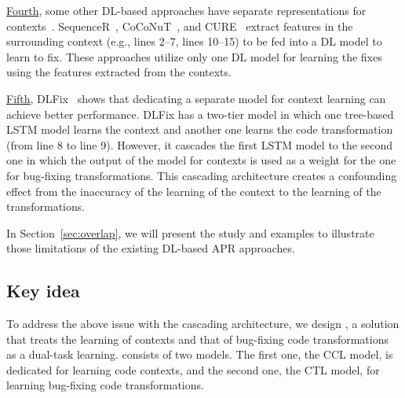 \underline{Fourth}, some other DL-based approaches have separate
representations for
contexts~\cite{chen2018sequencer,cure-icse21,lutellier2020coconut}.
SequenceR~\cite{chen2018sequencer},
CoCoNuT~\cite{lutellier2020coconut}, and CURE~\cite{cure-icse21}
extract features in the surrounding context (e.g., lines 2--7, lines
10--15) to be fed into a DL model to learn to fix. These approaches
utilize only one DL model for learning the fixes using the features
extracted from the contexts.


\underline{Fifth}, DLFix~\cite{icse20} shows that dedicating a
separate model for context learning can achieve better performance.
DLFix has a two-tier model in which one tree-based LSTM model learns
the context and another one learns the code transformation (from line
8 to line 9). However, it cascades the first LSTM model to the second
one in which the output of the model for contexts is used as a weight
for the one for bug-fixing transformations. This cascading
architecture creates a confounding effect from the inaccuracy of the
learning of the context to the learning of the transformations.

In Section~\ref{sec:overlap}, we will present the study and examples
to illustrate those limitations of the existing DL-based APR approaches.

\subsection{Key idea}
\label{sec:key-idea}

To address the above issue with the cascading architecture, we design
{\tool}, a solution that treats the learning of contexts and that of
bug-fixing code transformations as a dual-task learning. {\tool}
consists of two models. The first one, the CCL model, is
dedicated for learning code contexts, and the second one, the
CTL model, for learning bug-fixing code transformations.



